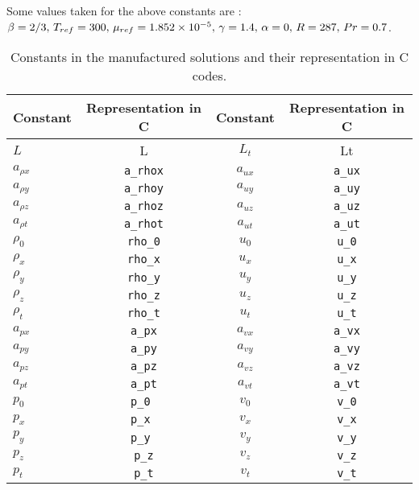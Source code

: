 Some values taken for the above constants are \citep{Ulerich2011}: $ \beta   = 2/3 , \, T_{ref} = 300 , \\ \, \mu_{ref} = 1.852\times 10^{-5},\, \gamma  = 1.4 ,\,\alpha  = 0,\,  R = 287,\, Pr  = 0.7$. 

\begin{table}[htb]
\caption{Constants in the manufactured solutions and their representation in C codes.}
\centering
\begin{tabular}{l c | c c}
\hline\hline
     Constant     &Representation in C  & Constant     & Representation in C \\ [0.25ex]
\hline 
$L$			  & L	   				&  $ L_{t}$ 	& Lt	   \\
$ a_{\rho x}$ & \texttt{a\_rhox}	&  $a_{ux}$ 	&\texttt{a\_ux}    \\ 
$ a_{\rho y}$ & \texttt{a\_rhoy}	&  $ a_{uy}$ 	& \texttt{a\_uy}   \\ 
$ a_{\rho z}$ & \texttt{a\_rhoz}	&  $ a_{uz}$ 	& \texttt{a\_uz}   \\ 
$ a_{\rho t}$ & \texttt{a\_rhot}	&  $ a_{ut}$ 	& \texttt{a\_ut}   \\ 
$ \rho_{0}$  & 	\texttt{rho\_0}   	&  $ u_{0}$ 		& \texttt{u\_0}   \\ 
$ \rho_{x}$ & 	\texttt{rho\_x}   	&  $ u_{x}$ 	& \texttt{u\_x}   \\
$ \rho_{y}$ & 	\texttt{rho\_y}   	&  $ u_{y}$ 	& \texttt{u\_y}   \\ 
$ \rho_{z}$ & 	\texttt{rho\_z}   	&  $ u_{z}$ 	& \texttt{u\_z}   \\ 
$ \rho_{t}$ & 	\texttt{rho\_t}   	&  $ u_{t}$ 	& \texttt{u\_t}   \\ 
$ a_{px}$ & 	\texttt{a\_px}   	&  $ a_{vx}$ 	& \texttt{a\_vx}   \\ 
$ a_{py}$ & 	\texttt{a\_py}   	&  $ a_{vy}$ 	& \texttt{a\_vy}   \\ 
$ a_{pz}$ & 	\texttt{a\_pz}   	&  $ a_{vz}$ 	& \texttt{a\_vz}   \\ 
$ a_{pt}$ & 	\texttt{a\_pt}   	&  $ a_{vt}$ 	& \texttt{a\_vt}   \\ 
$ p_{0}$ & 		\texttt{p\_0 }  	&  $ v_{0}$ 		& \texttt{v\_0}   \\ 
$ p_{x}$ & 		\texttt{p\_x }  	&  $ v_{x}$ 	& \texttt{v\_x}   \\ 
$ p_{y}$ &		\texttt{p\_y }  	&  $ v_{y}$		& \texttt{v\_y}   \\ 
$ p_{z}$ & 		\texttt{p\_z}   	&  $ v_{z}$		& \texttt{v\_z}   \\
$ p_{t}$ & 		\texttt{p\_t}   	&  $ v_{t}$		& \texttt{v\_t}   \\ 

\end{tabular}
\end{table}
